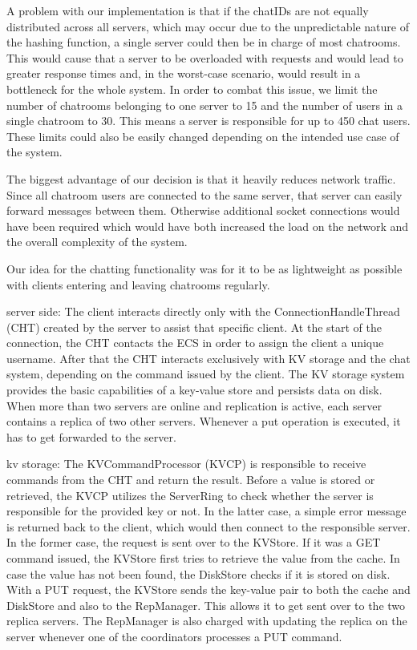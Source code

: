 A problem with our implementation is that if the chatIDs are not equally distributed across all servers, which may occur due to the unpredictable nature of the hashing function, a single server could then be in charge of most chatrooms. This would cause that a server to be overloaded with requests and would lead to greater response times and, in the worst-case scenario, would result in a bottleneck for the whole system. In order to combat this issue, we limit the number of chatrooms belonging to one server to 15 and the number of users in a single chatroom to 30. This means a server is responsible for up to 450 chat users. These limits could also be easily changed depending on the intended use case of the system.

The biggest advantage of our decision is that it heavily reduces network traffic. Since all chatroom users are connected to the same server, that server can easily forward messages between them. Otherwise additional socket connections would have been required which would have both increased the load on the network and the overall complexity of the system.

Our idea for the chatting functionality was for it to be as lightweight as possible with clients entering and leaving chatrooms regularly.

server side:
The client interacts directly only with the ConnectionHandleThread (CHT) created by the server to assist that specific client. At the start of the connection, the CHT contacts the ECS in order to assign the client a unique username. After that the CHT interacts exclusively with KV storage and the chat system, depending on the command issued by the client. The KV storage system provides the basic capabilities of a key-value store and persists data on disk. When more than two servers are online and replication is active, each server contains a replica of two other servers. Whenever a put operation is executed, it has to get forwarded to the server.

kv storage:
The KVCommandProcessor (KVCP) is responsible to receive commands from the CHT and return the result. Before a value is stored or retrieved, the KVCP utilizes the ServerRing to check whether the server is responsible for the provided key or not. In the latter case, a simple error message is returned back to the client, which would then connect to the responsible server. In the former case, the request is sent over to the KVStore. If it was a GET command issued, the KVStore first tries to retrieve the value from the cache. In case the value has not been found, the DiskStore checks if it is stored on disk.
With a PUT request, the KVStore sends the key-value pair to both the cache and DiskStore and also to the RepManager. This allows it to get sent over to the two replica servers. The RepManager is also charged with updating the replica on the server whenever one of the coordinators processes a PUT command.

